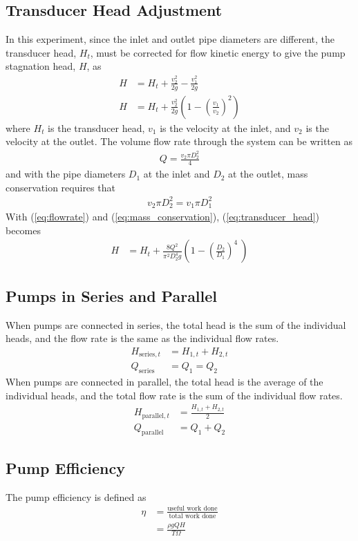 \subsection{Transducer Head Adjustment}
In this experiment, since the inlet and outlet pipe diameters are different, the transducer head, $H_t$, must be corrected for flow kinetic energy to give the pump stagnation head, $H$, as
\begin{align}
    H &= H_t + \frac{v_2^2}{2g} - \frac{v_1^2}{2g} \nonumber \\
    H &= H_t + \frac{v_2^2}{2g} \left(1 - \left(\frac{v_1}{v_2}\right)^2\right) \label{eq:transducer_head}
\end{align}
where $H_t$ is the transducer head, $v_1$ is the velocity at the inlet, and $v_2$ is the velocity at the outlet. The volume flow rate through the system can be written as
\begin{align}
    Q = \frac{v_2 \pi D_2^2}{4} \label{eq:flowrate}
\end{align}
and with the pipe diameters $D_1$ at the inlet and $D_2$ at the outlet, mass conservation requires that
\begin{align}
    v_2 \pi D_2^2 = v_1 \pi D_1^2 \label{eq:mass_conservation}
\end{align}
With (\ref{eq:flowrate}) and (\ref{eq:mass_conservation}), (\ref{eq:transducer_head}) becomes
\begin{align}
    H &= H_t + \frac{8Q^2}{\pi^2 D_2^4 g} \left(1 - \left(\frac{D_2}{D_1}\right)^4\ \right) \label{eq:transducer_head2}
\end{align}

\subsection{Pumps in Series and Parallel}
When pumps are connected in series, the total head is the sum of the individual heads, and the flow rate is the same as the individual flow rates. 
\begin{align}
    H_{\text{series}, t} &= H_{1,t} + H_{2,t} \label{eq:series_head}  \\
    Q_{\text{series}} &= Q_1 = Q_2 \label{eq:series_flow}
\end{align} 
When pumps are connected in parallel, the total head is the average of the individual heads, and the total flow rate is the sum of the individual flow rates.
\begin{align}
    H_{\text{parallel}, t} &= \frac{H_{1,t} + H_{2,t}}{2} \label{eq:parallel_head} \\
    Q_{\text{parallel}} &= Q_1 + Q_2 \label{eq:parallel_flow}
\end{align}
\subsection{Pump Efficiency}
The pump efficiency is defined as
\begin{align}
    \eta &= \frac{\text{useful work done}}{\text{total work done}} \nonumber \\
    &= \frac{\rho g Q H}{T \Omega} \label{eq:pump_efficiency}
\end{align}
